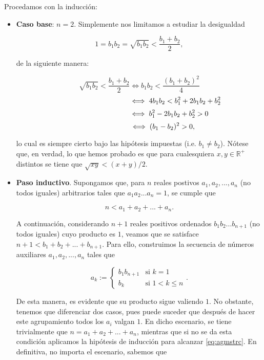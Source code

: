 \documentclass{article}
\begin{document}
\begin{itemize}
    Procedamos con la inducción:

    \begin{itemize}
        \item \textbf{Caso base}: $n = 2$. Simplemente nos limitamos a estudiar la desigualdad
        
        \[1 = b_1b_2 = \sqrt{b_1b_2} < \frac{b_1 + b_2}{2},\]

        de la siguiente manera:

        \[\sqrt{b_1b_2} < \frac{b_1 + b_2}{2} \iff b_1b_2 < \frac{(b_1 + b_2)^2}{4}\]
        \[\hspace{100px} \iff 4b_1b_2 < b_1^2 + 2b_1b_2 + b_2^2\]
        \[\hspace{83px}\iff b_1^2 - 2b_1b_2 + b_2^2 > 0\]
        \[\hspace{65px}\iff (b_1 - b_2)^2 > 0,\]

        lo cual es siempre cierto bajo las hipótesis impuestas (i.e. $b_1 \neq b_2$). Nótese que, en verdad, lo que hemos probado es que para cualesquiera $x, y \in \mathbb{R}^+$ distintos se tiene que $\sqrt{xy} < (x + y) / 2$.

        \item \textbf{Paso inductivo}. Supongamos que, para $n$ reales postivos $a_1, a_2, ..., a_n$ (no todos iguales) arbitrarios tales que $a_1a_2...a_n = 1$, se cumple que
        
        \begin{equation}
            n < a_1 + a_2 + ... + a_n.
            \label{eq:agmstrc}
        \end{equation}

        A continuación, considerando $n + 1$ reales positivos ordenados $b_1b_2...b_{n+1}$ (no todos iguales) cuyo producto es $1$, veamos que se satisface $n + 1 < b_1 + b_2 + ... + b_{n + 1}$. Para ello, construimos la secuencia de números auxiliares $a_1, a_2, ..., a_n$ tales que

        \[
        a_k := 
        \begin{cases}
            b_1b_{n + 1} & \text{si $k = 1$} \\
            b_k & \text{si $1 < k \leq n$}
        \end{cases}
        .\]

        De esta manera, es evidente que su producto sigue valiendo $1$. No obstante, tenemos que diferenciar dos casos, pues puede suceder que después de hacer este
        agrupamiento todos los $a_i$ valgan $1$. En dicho escenario, se tiene trivialmente que $n = a_1 + a_2 + ... + a_n$, mientras que si no se da esta condición aplicamos 
        la hipótesis de inducción para alcanzar \eqref{eq:agmstrc}. En definitiva, no importa el escenario, sabemos que


\end{itemize}
\end{itemize}
\end{document}
